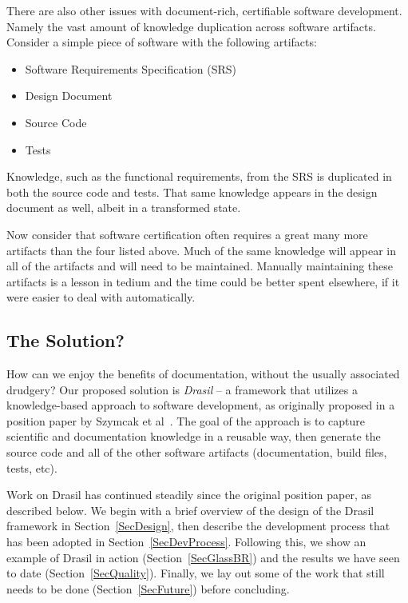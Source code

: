 \documentclass[sigconf]{acmart}
\begin{document}
There are also other issues with document-rich, certifiable software 
development. Namely the vast amount of knowledge duplication across software 
artifacts. Consider a simple piece of software with the following artifacts:

\begin{itemize}
\item Software Requirements Specification (SRS)
\item Design Document
\item Source Code
\item Tests
\end{itemize}
Knowledge, such as the functional requirements, from the SRS is duplicated in 
both the source code and tests. That same knowledge appears in the design 
document as well, albeit in a transformed state. 

Now consider that software certification often requires a great many more 
artifacts than the four listed above. Much of the same knowledge will appear in 
all of the artifacts and will need to be maintained. Manually maintaining these 
artifacts is a lesson in tedium and the time could be better spent elsewhere, if 
it were easier to deal with automatically.

\subsection*{The Solution?}

How can we enjoy the benefits of documentation, without the usually associated
drudgery?  Our proposed solution is \textit{Drasil} -- a framework that utilizes
a knowledge-based approach to software development, as originally proposed in a
position paper by Szymcak et al~\cite{SzymczakEtAl2016}. The goal of the
approach is to capture scientific and documentation knowledge in a reusable way,
then generate the source code and all of the other software artifacts
(documentation, build files, tests, etc).

Work on Drasil has continued steadily since the original position paper, as
described below. We begin with a brief overview of the design of the Drasil
framework in Section~\ref{SecDesign}, then describe the development process that
has been adopted in Section~\ref{SecDevProcess}. Following this, we show an example of
Drasil in action (Section~\ref{SecGlassBR}) and the results we have seen to date
(Section~\ref{SecQuality}). Finally, we lay out some of the work that still
needs to be done (Section~\ref{SecFuture}) before concluding.
\end{document}
